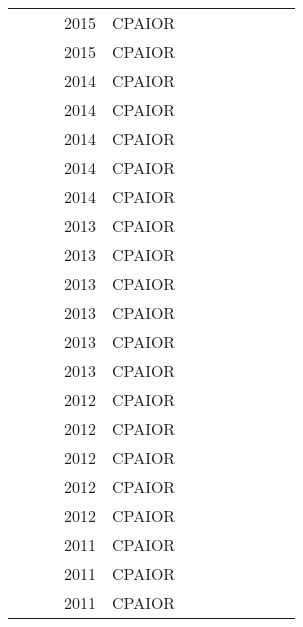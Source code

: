 \documentclass[a4paper]{article}
\begin{document}
{\begin{longtable}{p{3cm}p{6cm}rrcrlcccp{1.5cm}l}
& \href{papers/PesantRR15.pdf}{} & \cite{PesantRR15} & 2015 & CPAIOR & & & & & & & \\
& \href{papers/VilimLS15.pdf}{} & \cite{VilimLS15} & 2015 & CPAIOR & & & & & & & \\
& \href{papers/KoschB14.pdf}{} & \cite{KoschB14} & 2014 & CPAIOR & & & & & & & \\
& \href{papers/BonfiettiLM14.pdf}{} & \cite{BonfiettiLM14} & 2014 & CPAIOR & & & & & & & \\
& \href{papers/DejemeppeD14.pdf}{} & \cite{DejemeppeD14} & 2014 & CPAIOR & & & & & & & \\
& \href{papers/BessiereHMQW14.pdf}{} & \cite{BessiereHMQW14} & 2014 & CPAIOR & & & & & & & \\
& \href{papers/DoulabiRP14.pdf}{} & \cite{DoulabiRP14} & 2014 & CPAIOR & & & & & & & \\
& \href{papers/HeinzKB13.pdf}{} & \cite{HeinzKB13} & 2013 & CPAIOR & & & & & & & \\
& \href{papers/KelarevaTK13.pdf}{} & \cite{KelarevaTK13} & 2013 & CPAIOR & & & & & & & \\
& \href{papers/LetortCB13.pdf}{} & \cite{LetortCB13} & 2013 & CPAIOR & & & & & & & \\
& \href{papers/cpaior-SchuttFS13.pdf}{} & \cite{cpaior-SchuttFS13} & 2013 & CPAIOR & & & & & & & \\
& \href{papers/CireCH13.pdf}{} & \cite{CireCH13} & 2013 & CPAIOR & & & & & & & \\
& \href{papers/GuSS13.pdf}{} & \cite{GuSS13} & 2013 & CPAIOR & & & & & & & \\
& \href{papers/BillautHL12.pdf}{} & \cite{BillautHL12} & 2012 & CPAIOR & & & & & & & \\
& \href{papers/BonfiettiLBM12.pdf}{} & \cite{BonfiettiLBM12} & 2012 & CPAIOR & & & & & & & \\
& \href{papers/HeinzB12.pdf}{} & \cite{HeinzB12} & 2012 & CPAIOR & & & & & & & \\
& \href{papers/RendlPHPR12.pdf}{} & \cite{RendlPHPR12} & 2012 & CPAIOR & & & & & & & \\
& \href{papers/SchuttCSW12.pdf}{} & \cite{SchuttCSW12} & 2012 & CPAIOR & & & & & & & \\
& \href{papers/ChapadosJR11.pdf}{} & \cite{ChapadosJR11} & 2011 & CPAIOR & & & & & & & \\
& \href{papers/EdisO11.pdf}{} & \cite{EdisO11} & 2011 & CPAIOR & & & & & & & \\
& \href{papers/LahimerLH11.pdf}{} & \cite{LahimerLH11} & 2011 & CPAIOR & & & & & & & \\

\end{longtable}}
\end{document}
